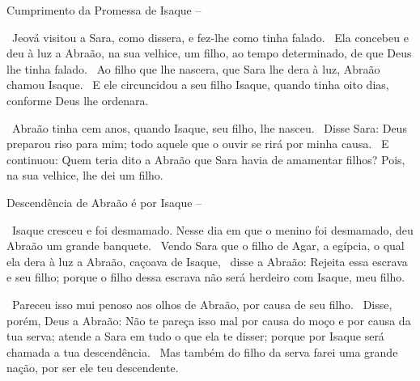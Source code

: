 \documentclass[12pt,aspectratio=169]{beamer}
\newcommand{\ver}[1]{%
    \raisebox{0.50ex}{%
        \scalebox{1.1}{%
            \pmb{\textbf{\textcolor{BSpbg}{#1}}}%
        }%
    }%
}
\newcommand{\QUOTE}[1]{%
    \par\noindent\hspace*{0.05\linewidth}%
    \begin{minipage}{0.9\linewidth}%
        \linespread{1.35}\large{#1}%
    \end{minipage}%
}
\newcommand{\RED}[1]{{\textcolor{TXred}{#1}}}
\newcommand{\YEL}[1]{{\textcolor{TXyel}{#1}}}
\newcommand{\GRE}[1]{{\textcolor{TXgre}{#1}}}
\newcommand{\BLU}[1]{{\textcolor{TXblu}{#1}}}
\newcommand{\MAG}[1]{{\textcolor{TXmag}{#1}}}
\newcommand{\BRI}[1]{{\textcolor{BSpbg}{#1}}}   %
\begin{document}
    \begin{frame}[allowframebreaks]{Cumprimento da Promessa de \YEL{Isaque} --}
        \QUOTE{%
            \ver{Gn 21.1}~Jeová \BRI{visitou} a Sara, \MAG{como dissera}, e \BRI{fez}-lhe
            \MAG{como tinha falado}.
            \ver{2}~Ela concebeu e deu à luz a Abraão, na sua velhice, um filho, \MAG{ao tempo
            determinado}, de que \BLU{Deus} lhe tinha \BLU{falado}.
            \ver{3}~Ao filho que lhe nascera, que Sara lhe dera à luz, Abraão chamou
            \YEL{Isaque}.
            \ver{4}~E ele \YEL{circuncidou} a seu filho Isaque, quando tinha \YEL{oito dias},
            \YEL{conforme Deus lhe ordenara}.
        }

        \pagebreak

        \QUOTE{%
            \ver{5}~Abraão tinha \GRE{cem anos}, quando Isaque, seu filho, lhe nasceu.
            \ver{6}~Disse Sara: Deus preparou \GRE{riso} para mim; todo aquele que o ouvir se
            rirá por minha causa.
            \ver{7}~E continuou: \BLU{Quem} teria dito a Abraão que Sara havia de amamentar
            filhos?  Pois, na sua velhice, lhe dei um filho.
        }
    \end{frame}

    \begin{frame}[allowframebreaks]{Descendência de Abraão é por \YEL{Isaque} --}
        \QUOTE{%
            \ver{Gn 21.8}~Isaque cresceu e foi \BRI{desmamado}. Nesse dia em que o menino foi
            desmamado, deu Abraão um grande banquete.
            \ver{9}~Vendo Sara que o filho de Agar, a egípcia, o qual ela dera à luz a Abraão,
            \RED{caçoava} de Isaque,
            \ver{10}~disse a Abraão: Rejeita essa escrava e seu filho; \BRI{porque o filho dessa
            escrava não será herdeiro com Isaque, meu filho}.
        }

        \pagebreak

        \QUOTE{%
            \ver{11}~Pareceu isso mui penoso aos olhos de Abraão, por causa de seu filho.
            \ver{12}~Disse, porém, Deus a Abraão: Não te pareça isso mal por causa do moço e por
            causa da tua serva; \BRI{atende a Sara} em tudo o que ela te disser; porque \YEL{por
            Isaque será chamada a tua descendência}.
            \ver{13}~Mas também do filho da serva \BRI{farei uma grande nação, por ser ele teu
            descendente}.
        }
    \end{frame}
\end{document}
